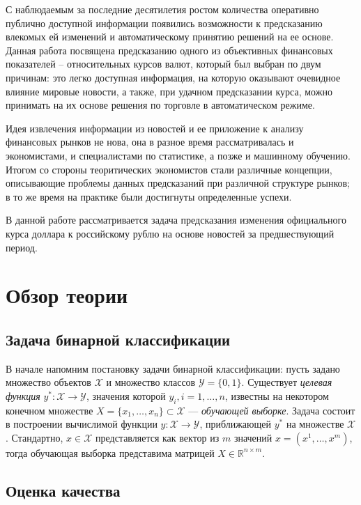 \documentclass[pdftex,ptm,14pt,a4paper]{extreport}
\begin{document}
С наблюдаемым за последние десятилетия ростом количества оперативно публично доступной информации появились возможности к предсказанию влекомых ей изменений и автоматическому принятию решений на ее основе.
Данная работа посвящена предсказанию одного из объективных финансовых показателей -- относительных курсов валют, который был выбран по двум причинам: это легко доступная информация, на которую оказывают очевидное влияние мировые новости, а также, при удачном предсказании курса, можно принимать на их основе решения по торговле в автоматическом режиме.

Идея извлечения информации из новостей и ее приложение к анализу финансовых рынков не нова, она
в разное время рассматривалась и экономистами, и специалистами по статистике, а позже и машинному обучению.
Итогом со стороны теоритических экономистов стали различные концепции,
описывающие проблемы данных предсказаний при различной структуре рынков; в то же время на практике
были достигнуты определенные успехи.

В данной работе рассматривается задача предсказания изменения официального курса доллара к российскому рублю
на основе новостей за предшествующий период.

\tableofcontents

\chapter{Обзор теории}

\section{Задача бинарной классификации}

В начале напомним постановку задачи бинарной классификации\cite{bin_classif}: пусть задано множество объектов $\mathcal{X}$ и
множество классов $\mathcal{Y} = \{0,1\}$.  Существует \textit{целевая функция} $y^*:\mathcal{X}\to\mathcal{Y}$,
значения которой $y_i, i=1,\ldots,n$, известны на некотором конечном множестве
$X = \{x_1,\ldots,x_n\} \subset \mathcal{X}$ --- \textit{обучающей выборке}. Задача состоит в построении вычислимой функции
$y:\mathcal{X}\to\mathcal{Y}$, приближающей $y^*$ на множестве $\mathcal{X}$.
Стандартно, $x\in\mathcal{X}$ представляется как вектор из $m$ значений $x=(x^1,\ldots,x^m)$, тогда обучающая выборка
представима матрицей $X\in \mathbb{R}^{n\times m}$.

\section{Оценка качества}
\end{document}
